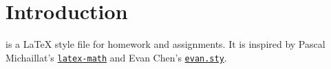 \section{Introduction}

\asdiasty{} is a \LaTeX{} style file for homework and assignments. It is inspired by Pascal Michaillat's \href{https://github.com/pmichaillat/latex-math}{\texttt{latex-math}} and Evan Chen's \href{https://github.com/vEnhance/dotfiles/blob/main/texmf/tex/latex/evan/evan.sty}{\texttt{evan.sty}}.